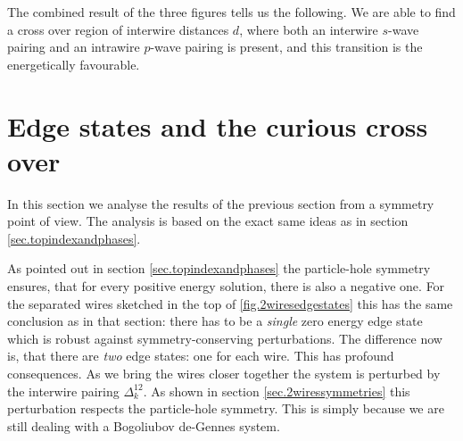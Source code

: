 The combined result of the three figures tells us the following. We are able to find a cross over region of interwire distances $d$, where both an interwire $s$-wave pairing and an intrawire $p$-wave pairing is present, and this transition is the energetically favourable. 

\section{Edge states and the curious cross over}
\label{sec.2wiresedgestates_crossover_topology}
In this section we analyse the results of the previous section from a symmetry point of view. The analysis is based on the exact same ideas as in section \ref{sec.topindexandphases}. 

As pointed out in section \ref{sec.topindexandphases} the particle-hole symmetry ensures, that for every positive energy solution, there is also a negative one. For the separated wires sketched in the top of \ref{fig.2wiresedgestates} this has the same conclusion as in that section: there has to be a \textit{single} zero energy edge state which is robust against symmetry-conserving perturbations. The difference now is, that there are \textit{two} edge states: one for each wire. This has profound consequences. As we bring the wires closer together the system is perturbed by the interwire pairing $\Delta^{12}_k$. As shown in section \ref{sec.2wiressymmetries} this perturbation respects the particle-hole symmetry. This is simply because we are still dealing with a Bogoliubov de-Gennes system. 

